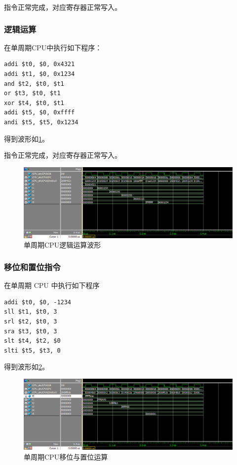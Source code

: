 \documentclass{ctexart}
\begin{document}
	指令正常完成，对应寄存器正常写入。

	\subsubsection{逻辑运算}
	在单周期CPU中执行如下程序：
\begin{lstlisting}
addi $t0, $0, 0x4321
addi $t1, $0, 0x1234
and $t2, $t0, $t1
or $t3, $t0, $t1
xor $t4, $t0, $t1
addi $t5, $0, 0xffff
andi $t5, $t5, 0x1234	
\end{lstlisting}

得到波形如\ref{simpicture3}。

指令正常完成，对应寄存器正常写入。

	\begin{figure}[ht]
		\centering
		\includegraphics[width = \textwidth]{OneCycleTestWave2.eps}
		\caption{单周期CPU逻辑运算波形}
		\label{simpicture3}
	\end{figure}

	\subsubsection{移位和置位指令}

	在单周期 CPU 中执行如下程序

\begin{lstlisting}
addi $t0, $0, -1234
sll $t1, $t0, 3
srl $t2, $t0, 3
sra $t3, $t0, 3
slt $t4, $t2, $0
slti $t5, $t3, 0
\end{lstlisting}

	得到波形如\ref{simpicture4}。

	\begin{figure}[ht]
		\centering
		\includegraphics[width = \textwidth]{OneCycleTestWave3.eps}
		\caption{单周期CPU移位与置位运算}
		\label{simpicture4}
	\end{figure}	
\end{document}
